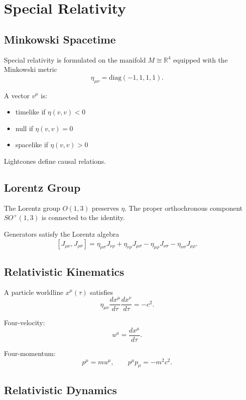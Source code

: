 \documentclass[12pt]{article}
\begin{document}
\section{Special Relativity}

\subsection{Minkowski Spacetime}

Special relativity is formulated on the manifold $M \cong \mathbb{R}^4$ 
equipped with the Minkowski metric
\[
\eta_{\mu\nu} = \mathrm{diag}(-1,1,1,1).
\]

A vector $v^\mu$ is:
\begin{itemize}
\item timelike if $\eta(v,v)<0$
\item null if $\eta(v,v)=0$
\item spacelike if $\eta(v,v)>0$
\end{itemize}

Lightcones define causal relations.

\subsection{Lorentz Group}

The Lorentz group $O(1,3)$ preserves $\eta$. The proper orthochronous 
component $SO^+(1,3)$ is connected to the identity.

Generators satisfy the Lorentz algebra 
\[
[J_{\mu\nu},J_{\rho\sigma}]
= \eta_{\mu\sigma}J_{\nu\rho}
+ \eta_{\nu\rho}J_{\mu\sigma}
- \eta_{\mu\rho}J_{\nu\sigma}
- \eta_{\nu\sigma}J_{\mu\rho}.
\]

\subsection{Relativistic Kinematics}

A particle worldline $x^\mu(\tau)$ satisfies
\[
\eta_{\mu\nu}\frac{dx^\mu}{d\tau}\frac{dx^\nu}{d\tau}=-c^2.
\]

Four-velocity:
\[
u^\mu = \frac{dx^\mu}{d\tau}.
\]

Four-momentum:
\[
p^\mu = m u^\mu,\qquad
p^\mu p_\mu = -m^2 c^2.
\]

\subsection{Relativistic Dynamics}
\end{document}

